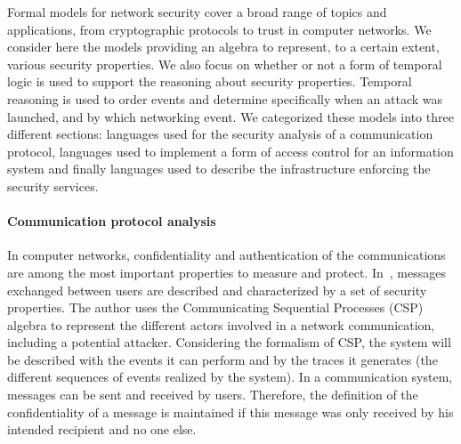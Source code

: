 Formal models for network security cover a broad range of topics and applications, from cryptographic protocols to trust in computer networks.
We consider here the models providing an algebra to represent, to a certain extent, various security properties. 
We also focus on whether or not a form of temporal logic is used to support the reasoning about security properties.
Temporal reasoning is used to order events and determine specifically when an attack was launched, and by which networking event. 
We categorized these models into three different sections: languages used for the security analysis of a communication protocol, languages used to implement a form of access control for an information system and finally languages used to describe the infrastructure enforcing the security services.

\paragraph{Communication protocol analysis}
In computer networks, confidentiality and authentication of the communications are among the most important properties to measure and protect.
In~\cite{CSP-Schneider1996}, messages exchanged between users are described and characterized by a set of security properties.
The author uses the Communicating Sequential Processes (CSP) algebra to represent the different actors involved in a network communication, including a potential attacker. 
Considering the formalism of CSP, the system will be described with the events it can perform and by the traces it generates (\ie the different sequences of events realized by the system).
In a communication system, messages can be sent and received by users.
Therefore, the definition of the confidentiality of a message is maintained if this message was only received by his intended recipient and no one else.

